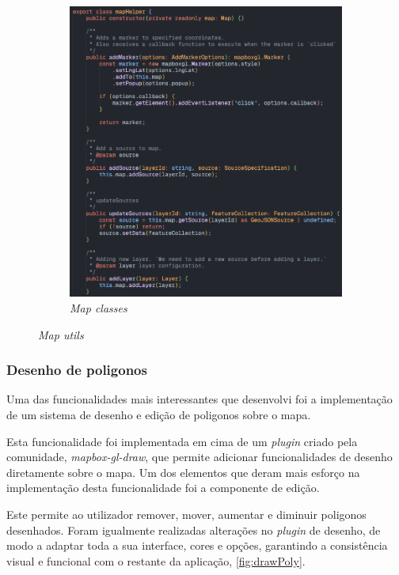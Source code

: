 \begin{figure}[!h]
\begin{subfigure}[c]{0.40\textwidth}
		\includegraphics[width=\textwidth]{figs/mapClasses.png}
		\caption{\textit{Map classes}}
		\label{fig:mapClasses}
	\end{subfigure}
	\caption{\textit{Map utils}}
    \label{fig:mapUtils}
\end{figure}

\clearpage

\subsubsection{\textbf{Desenho de poligonos}}\label{sec:polyDraw}
Uma das funcionalidades mais interessantes que desenvolvi foi a implementação de um sistema de desenho e edição de poligonos sobre o mapa.

Esta funcionalidade foi implementada em cima de um \textit{plugin} criado pela comunidade, \textit{mapbox-gl-draw}\cite{mapbox.docs.url}, que permite adicionar funcionalidades de desenho diretamente sobre o mapa. Um dos elementos que deram mais esforço na implementação desta funcionalidade foi a componente de edição. 

Este permite ao utilizador remover, mover, aumentar e diminuir poligonos desenhados. Foram igualmente realizadas alterações no \textit{plugin} de desenho, de modo a adaptar toda a sua interface, cores e opções, garantindo a consistência visual e funcional com o restante da aplicação, \autoref{fig:drawPoly}.

